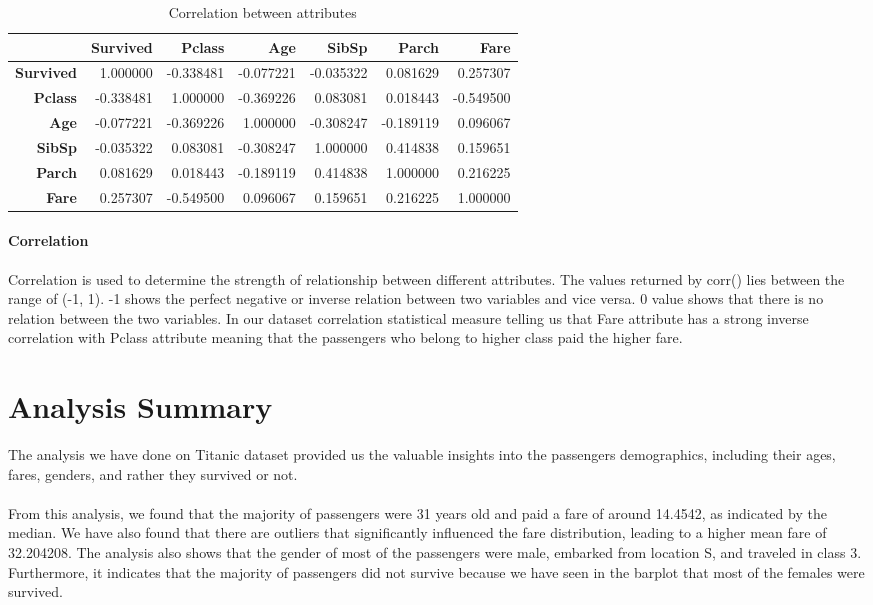\documentclass[a4paper, 12pt]{article}
\begin{document}
\begin{table}[h]
  \centering
  \begin{tabular}{|r|r|r|r|r|r|r|}
    \hline
    & \textbf{Survived} & \textbf{Pclass} & \textbf{Age} & \textbf{SibSp} & \textbf{Parch} & \textbf{Fare} \\
    \hline
    \textbf{Survived} & 1.000000 & -0.338481 & -0.077221 & -0.035322 & 0.081629 & 0.257307 \\
    \textbf{Pclass} & -0.338481 & 1.000000 & -0.369226 & 0.083081 & 0.018443 & -0.549500 \\
    \textbf{Age} & -0.077221 & -0.369226 & 1.000000 & -0.308247 & -0.189119 & 0.096067 \\
    \textbf{SibSp} & -0.035322 & 0.083081 & -0.308247 & 1.000000 & 0.414838 & 0.159651 \\
    \textbf{Parch} & 0.081629 & 0.018443 & -0.189119 & 0.414838 & 1.000000 & 0.216225 \\
    \textbf{Fare} & 0.257307 & -0.549500 & 0.096067 & 0.159651 & 0.216225 & 1.000000 \\
    \hline
  \end{tabular}
  \caption{Correlation between attributes} 
  \paragraph*{Correlation}
  \justifying
Correlation is used to determine the strength of relationship between different attributes. The values returned by corr() lies between the range of (-1, 1). -1 shows the perfect negative or inverse relation between two variables and vice versa. 0 value shows that there is no relation between the two variables. In our dataset correlation statistical measure telling us that Fare attribute has a strong inverse correlation with Pclass attribute meaning that the passengers who belong to higher class paid the higher fare.
\end{table} 
\clearpage
\section*{Analysis Summary}
\justifying
The analysis we have done on Titanic dataset provided us the valuable insights into the passengers demographics, including their ages, fares, genders, and rather they survived or not.
\paragraph*{}
From this analysis, we found that the majority of passengers were 31 years old and paid a fare of around 14.4542, as indicated by the median. We have also found that there are outliers that significantly influenced the fare distribution, leading to a higher mean fare of 32.204208. The analysis also shows that the gender of most of the passengers were male, embarked from location S, and traveled in class 3. Furthermore, it indicates that the majority of passengers did not survive because we have seen in the barplot that most of the females were survived.
\end{document}
